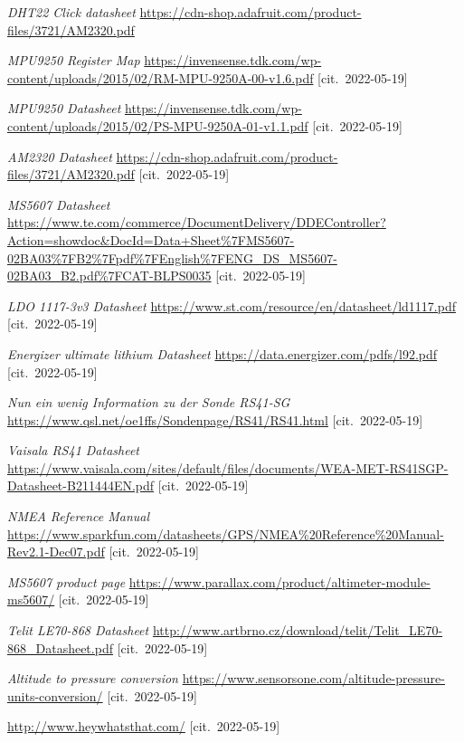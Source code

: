 \documentclass[twoside]{ctuthesis}
\theoremstyle{plain}
\theoremstyle{definition}
\theoremstyle{note}
\begin{document}
\begin{thebibliography}{1}
	\textit{DHT22 Click datasheet}
	\url{https://cdn-shop.adafruit.com/product-files/3721/AM2320.pdf}

	\textit{MPU9250 Register Map}
	\url{https://invensense.tdk.com/wp-content/uploads/2015/02/RM-MPU-9250A-00-v1.6.pdf} [cit.~2022-05-19]

	\textit{MPU9250 Datasheet}
	\url{https://invensense.tdk.com/wp-content/uploads/2015/02/PS-MPU-9250A-01-v1.1.pdf} [cit.~2022-05-19]

	\textit{AM2320 Datasheet}
	\url{https://cdn-shop.adafruit.com/product-files/3721/AM2320.pdf} [cit.~2022-05-19]

	\textit{MS5607 Datasheet}
	\url{https://www.te.com/commerce/DocumentDelivery/DDEController?Action=showdoc&DocId=Data+Sheet%7FMS5607-02BA03%7FB2%7Fpdf%7FEnglish%7FENG_DS_MS5607-02BA03_B2.pdf%7FCAT-BLPS0035} [cit.~2022-05-19]

	\textit{LDO 1117-3v3 Datasheet}
	\url{https://www.st.com/resource/en/datasheet/ld1117.pdf} [cit.~2022-05-19]

	\textit{Energizer ultimate lithium Datasheet}
	\url{https://data.energizer.com/pdfs/l92.pdf} [cit.~2022-05-19]

	\textit{Nun ein wenig Information zu der Sonde RS41-SG}
	\url{https://www.qsl.net/oe1ffs/Sondenpage/RS41/RS41.html} [cit.~2022-05-19]

	\textit{Vaisala RS41 Datasheet}
	\url{https://www.vaisala.com/sites/default/files/documents/WEA-MET-RS41SGP-Datasheet-B211444EN.pdf} [cit.~2022-05-19]

	\textit{NMEA Reference Manual}
	\url{https://www.sparkfun.com/datasheets/GPS/NMEA%20Reference%20Manual-Rev2.1-Dec07.pdf} [cit.~2022-05-19]


	\textit{MS5607 product page}
	\url{https://www.parallax.com/product/altimeter-module-ms5607/} [cit.~2022-05-19]

	\textit{Telit LE70-868 Datasheet}
	\url{http://www.artbrno.cz/download/telit/Telit_LE70-868_Datasheet.pdf} [cit.~2022-05-19]

	\textit{Altitude to pressure conversion}
	\url{https://www.sensorsone.com/altitude-pressure-units-conversion/} [cit.~2022-05-19]

	\url{http://www.heywhatsthat.com/} [cit.~2022-05-19]




\end{thebibliography}
\end{document}
